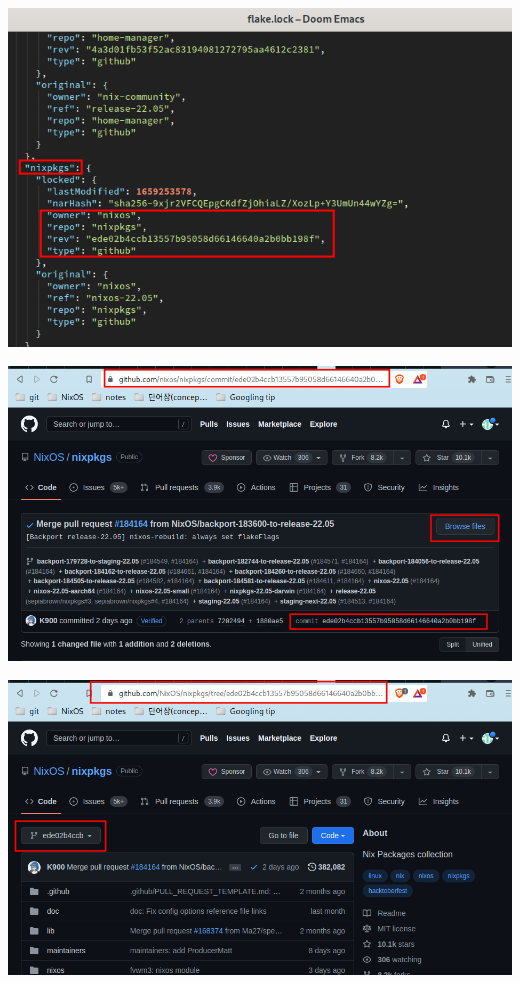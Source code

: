 \documentclass[11pt]{article}
\begin{document}
\begin{center}
\includegraphics[width=.9\linewidth]{./img/3_nix/repo find from flake.lock.png}
\end{center}
\begin{center}
\includegraphics[width=.9\linewidth]{./img/3_nix/repo find from flake.lock2.png}
\end{center}
\begin{center}
\includegraphics[width=.9\linewidth]{./img/3_nix/repo find from flake.lock3.png}
\end{center}
\end{document}

